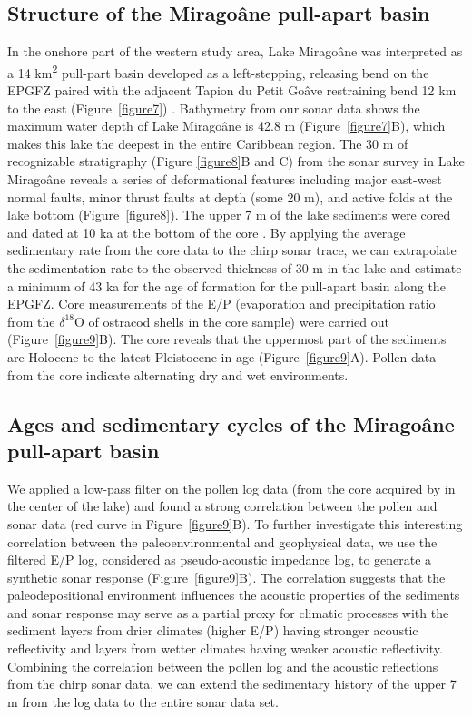 \documentclass[linenumbers,draft]{agujournal}
\providecommand{\DIFaddtex}[1]{{\protect\color{blue}\uwave{#1}}} %
\providecommand{\DIFdeltex}[1]{{\protect\color{red}\sout{#1}}}                      %
\providecommand{\DIFaddbegin}{} %
\providecommand{\DIFaddend}{} %
\providecommand{\DIFdelbegin}{} %
\providecommand{\DIFdelend}{} %
\providecommand{\DIFadd}[1]{\texorpdfstring{\DIFaddtex{#1}}{#1}} %
\providecommand{\DIFdel}[1]{\texorpdfstring{\DIFdeltex{#1}}{}} %
\begin{document}
\subsection{Structure of the Mirago\^ane pull-apart basin}
In the onshore part of the western study area, Lake Mirago\^ane was interpreted as a 14 km\textsuperscript{2} pull-part basin developed as a left-stepping, releasing bend on the EPGFZ paired with the adjacent Tapion du Petit Go\^ave restraining bend 12 km to the east (Figure~\ref{figure7}) \citep{mann1995actively,cowgill2012interactive}. Bathymetry from our sonar data shows the maximum water depth of Lake Mirago\^ane is 42.8 m (Figure~\ref{figure7}B), which makes this lake the deepest \citep{higuera199910} in the entire Caribbean region. The 30 m of recognizable stratigraphy (Figure \ref{figure8}B and C) from the sonar survey in Lake Mirago\^ane reveals a series of deformational features including major east-west normal faults, minor thrust faults at depth (some 20 m), and active folds at the lake bottom (Figure~\ref{figure8}). The upper 7 m of the lake sediments were cored and dated at 10 ka at the bottom of the core \citep{higuera199910}. By applying the average sedimentary rate from the core data to the chirp sonar trace, we can extrapolate the sedimentation rate to the observed thickness of 30 m in the lake and estimate a minimum of 43 ka for the age of formation for the pull-apart basin along the EPGFZ. Core measurements of the E/P (evaporation and precipitation ratio from the $\delta^{18}$O of ostracod shells in the core sample) were carried out \citep{higuera199910} (Figure~\ref{figure9}B). The core reveals that the uppermost part of the sediments are Holocene to the latest Pleistocene in age (Figure~\ref{figure9}A). Pollen data from the core indicate alternating dry and wet environments.

\subsection{Ages and sedimentary cycles of the Mirago\^ane pull-apart basin}
We applied a low-pass filter on the pollen log data (from the core acquired by \citet{higuera199910} in the center of the lake) and found a strong correlation between the pollen and sonar data (red curve in Figure~\ref{figure9}B). To further investigate this interesting correlation between the paleoenvironmental and geophysical data, we use the filtered E/P log, considered as pseudo-acoustic impedance log, to generate a synthetic sonar response (Figure~\ref{figure9}B). The correlation suggests that the paleodepositional environment influences the acoustic properties of the sediments and sonar response may serve as a partial proxy for climatic processes with the sediment layers from drier climates (higher E/P) having stronger acoustic reflectivity and layers from wetter climates having weaker acoustic reflectivity. Combining the correlation between the pollen log and the acoustic reflections from the chirp sonar data, we can extend the sedimentary history of the upper 7 m from the log data to the entire sonar \DIFdelbegin \DIFdel{data set}\DIFdelend \DIFaddbegin \DIFadd{dataset}\DIFaddend . 
\end{document}
